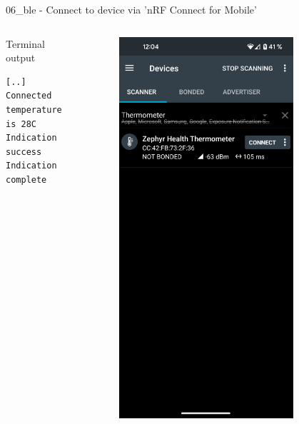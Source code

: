 \documentclass[10pt, aspectratio=169]{beamer}
\begin{document}
\begin{frame}[fragile]{06\_ble - Connect to device via 'nRF Connect for Mobile'}

  \begin{columns}[T,onlytextwidth]


  \begin{exampleblock}{Terminal output}

        {\fontsize{7}{9.6}\selectfont
          \begin{verbatim}
[..]
Connected
temperature is 28C
Indication success
Indication complete
          \end{verbatim}
        }
      \end{exampleblock}

      \begin{figure}
        \includegraphics[width=0.8\textwidth]{images/nrf_connect_scan.png}

\end{figure}
\end{columns}
\end{frame}
\end{document}
